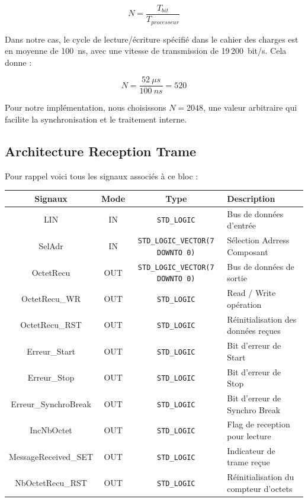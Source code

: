 \[
N = \frac{T_{bit}}{T_{processeur}}
\]

Dans notre cas, le cycle de lecture/écriture spécifié dans le cahier des charges est en moyenne de 100~ns, avec une vitesse de transmission de 19\,200~bit/s. Cela donne :

\[
N = \frac{52~\mu s}{100~ns} = 520
\]

Pour notre implémentation, nous choisissons \(N = 2048\), une valeur arbitraire qui facilite la synchronisation et le traitement interne.

\subsection{Architecture Reception Trame}

Pour rappel voici tous les signaux associés à ce bloc : 
\newline

\begin{center}
\renewcommand{\arraystretch}{1.2} %
\small %
    \begin{tabularx}{\textwidth}{|c||c|c|X|}
     \hline			
       \textbf{Signaux} & \textbf{Mode} & \textbf{Type} & \textbf{Description}  \\ \hline 
       LIN & IN & \texttt{STD\_LOGIC} & Bus de données d’entrée \\
       SelAdr & IN & \texttt{STD\_LOGIC\_VECTOR(7 DOWNTO 0)} & Sélection Adrress Composant \\
       OctetRecu & OUT & \texttt{STD\_LOGIC\_VECTOR(7 DOWNTO 0)} & Bus de données de sortie \\
       OctetRecu\_WR & OUT & \texttt{STD\_LOGIC} & Read / Write opération \\
       OctetRecu\_RST & OUT & \texttt{STD\_LOGIC} & Réinitialisation des données reçues \\
       Erreur\_Start & OUT & \texttt{STD\_LOGIC} & Bit d’erreur de Start \\
       Erreur\_Stop & OUT & \texttt{STD\_LOGIC} & Bit d’erreur de Stop\\
       Erreur\_SynchroBreak & OUT & \texttt{STD\_LOGIC} & Bit d’erreur de Synchro Break\\
       IncNbOctet & OUT & \texttt{STD\_LOGIC} & Flag de reception pour lecture \\
       MessageReceived\_SET & OUT & \texttt{STD\_LOGIC} & Indicateur de trame reçue \\
       NbOctetRecu\_RST & OUT & \texttt{STD\_LOGIC} & Réinitialisation du compteur d’octets \\
     \hline  
    \end{tabularx}
\end{center}

